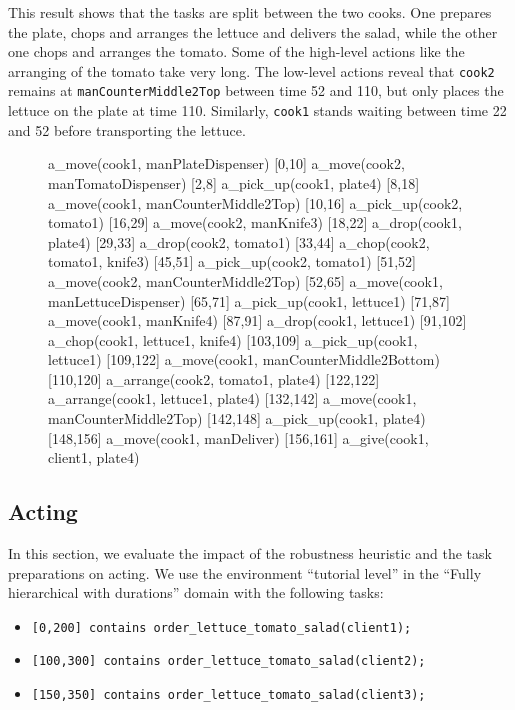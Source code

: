 This result shows that the tasks are split between the two cooks.
One prepares the plate, chops and arranges the lettuce and delivers the salad, while the other one chops and arranges the tomato.
Some of the high-level actions like the arranging of the tomato take very long.
The low-level actions reveal that \verb|cook2| remains at \verb|manCounterMiddle2Top| between time 52 and 110, but only places the lettuce on the plate at time 110.
Similarly, \verb|cook1| stands waiting between time 22 and 52 before transporting the lettuce.


\begin{figure}
  \begin{anmlcode}
  [0,2]     a_move(cook1, manPlateDispenser)
  [0,10]    a_move(cook2, manTomatoDispenser)
  [2,8]     a_pick_up(cook1, plate4)
  [8,18]    a_move(cook1, manCounterMiddle2Top)
  [10,16]   a_pick_up(cook2, tomato1)
  [16,29]   a_move(cook2, manKnife3)
  [18,22]   a_drop(cook1, plate4)
  [29,33]   a_drop(cook2, tomato1)
  [33,44]   a_chop(cook2, tomato1, knife3)
  [45,51]   a_pick_up(cook2, tomato1)
  [51,52]   a_move(cook2, manCounterMiddle2Top)
  [52,65]   a_move(cook1, manLettuceDispenser)
  [65,71]   a_pick_up(cook1, lettuce1)
  [71,87]   a_move(cook1, manKnife4)
  [87,91]   a_drop(cook1, lettuce1)
  [91,102]  a_chop(cook1, lettuce1, knife4)
  [103,109] a_pick_up(cook1, lettuce1)
  [109,122] a_move(cook1, manCounterMiddle2Bottom)
  [110,120] a_arrange(cook2, tomato1, plate4)
  [122,122] a_arrange(cook1, lettuce1, plate4)
  [132,142] a_move(cook1, manCounterMiddle2Top)
  [142,148] a_pick_up(cook1, plate4)
  [148,156] a_move(cook1, manDeliver)
  [156,161] a_give(cook1, client1, plate4)
  \end{anmlcode}
\end{figure}

\subsection{Acting}
\label{sec:evaluation-acting}

In this section, we evaluate the impact of the robustness heuristic and the task preparations on acting.
We use the environment ``tutorial level'' in the ``Fully hierarchical with durations'' domain with the following tasks:
\begin{itemize}
  \item \verb|[0,200] contains order_lettuce_tomato_salad(client1);|
  \item \verb|[100,300] contains order_lettuce_tomato_salad(client2);|
  \item \verb|[150,350] contains order_lettuce_tomato_salad(client3);|
\end{itemize}

